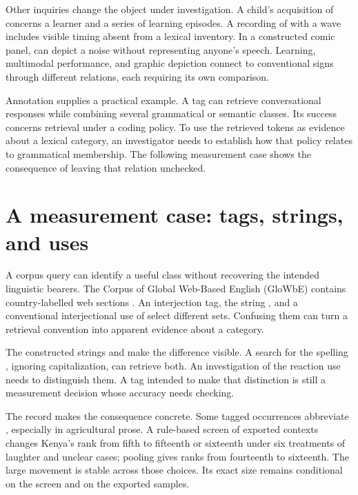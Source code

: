 \documentclass[12pt]{article}
\begin{document}
Other inquiries change the object under investigation. A child's acquisition
of  concerns a learner and a series of learning episodes.
A recording of  with a wave includes visible timing absent
from a lexical inventory. In a constructed comic panel, 
can depict a noise without representing anyone's speech. Learning,
multimodal performance, and graphic depiction connect to conventional signs
through different relations, each requiring its own comparison.

Annotation supplies a practical example. A tag can retrieve conversational
responses while combining several grammatical or semantic classes. Its
success concerns retrieval under a coding policy. To use the retrieved
tokens as evidence about a lexical category, an investigator needs
to establish how that policy relates to grammatical membership. The
following measurement case shows the consequence of leaving that relation
unchecked.

\section{A measurement case: tags, strings, and uses}\label{sec:evidence}

A corpus query can identify a useful class without recovering the intended
linguistic bearers. The Corpus of Global Web-Based English (GloWbE)
contains country-labelled web sections \citep{daviesfuchs2015}.
An interjection tag, the string , and a conventional
interjectional use of  select different sets. Confusing them
can turn a retrieval convention into apparent evidence about a category.

The constructed strings  and  make the difference visible. A search for the spelling
, ignoring capitalization, can retrieve both. An investigation
of the reaction use needs to distinguish them. A tag intended to
make that distinction is still a measurement decision whose accuracy
needs checking.

The  record makes the consequence concrete. Some tagged
occurrences abbreviate , especially in agricultural prose.
A rule-based screen of exported contexts changes Kenya's rank from fifth
to fifteenth or sixteenth under six treatments of laughter and unclear
cases; pooling gives ranks from fourteenth to sixteenth. The large
movement is stable across those choices. Its exact size remains
conditional on the screen and on the exported samples.
\end{document}
